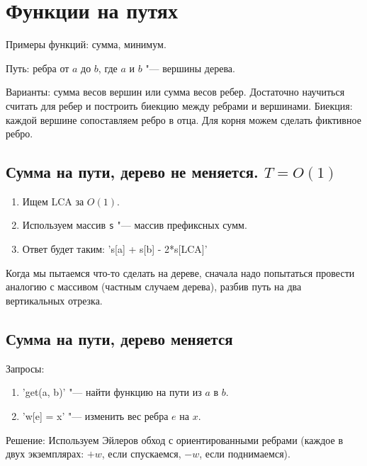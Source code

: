 \chapter{Функции на путях}

Примеры функций: сумма, минимум.

Путь: ребра от $a$ до $b$, где $a$ и $b$ "--- вершины дерева.

Варианты: сумма весов вершин или сумма весов ребер.
Достаточно научиться считать для ребер и построить биекцию между ребрами и вершинами.
Биекция: каждой вершине сопоставляем ребро в отца.
Для корня можем сделать фиктивное ребро.

\section{Сумма на пути, дерево не меняется. $T = O\left(1\right)$}

\begin{enumerate}
	\item Ищем LCA за $O\left(1\right)$.
	\item Используем массив \verb's' "--- массив префиксных сумм.
	\item Ответ будет таким: \cpp's[a] + s[b] - 2*s[LCA]'
\end{enumerate}


\begin{Rem}
	Когда мы пытаемся что-то сделать на дереве, сначала надо попытаться провести аналогию с массивом (частным случаем дерева),
	разбив путь на два вертикальных отрезка.
\end{Rem}


\section{Сумма на пути, дерево меняется}

Запросы:
\begin{enumerate}
	\item \cpp'get(a, b)' "--- найти функцию на пути из $a$ в $b$.
	\item \cpp'w[e] = x' "--- изменить вес ребра $e$ на $x$.
\end{enumerate}

Решение:
Используем Эйлеров обход с ориентированными ребрами (каждое в двух экземплярах: $+w$, если спускаемся, $-w$, если поднимаемся).


